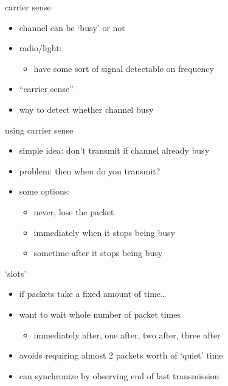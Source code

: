 \usetikzlibrary{arrows.meta}
\begin{frame}{carrier sense}
    \begin{itemize}
    \item channel can be `busy' or not
    \item radio/light:
        \begin{itemize}
        \item have some sort of signal detectable on frequency
        \end{itemize}
    \vspace{.5cm}
    \item ``carrier sense''
    \item way to detect whether channel busy
    \end{itemize}
\end{frame}

\begin{frame}{using carrier sense}
    \begin{itemize}
    \item simple idea: don't transmit if channel already busy
    \vspace{.5cm}
    \item problem: then when do you transmit?
    \item some options:
        \begin{itemize}
        \item never, lose the packet
        \item immediately when it stops being busy
        \item sometime after it stops being busy
        \end{itemize}
    \end{itemize}
\end{frame}

\begin{frame}{`slots'}
\begin{itemize}
\item if packets take a fixed amount of time\ldots
\item want to wait whole number of packet times
    \begin{itemize}
    \item immediately after, one after, two after, three after
    \end{itemize}
\item avoids requiring almost 2 packets worth of `quiet' time
\item can synchronize by observing end of last transmission
\end{itemize}
\end{frame}

